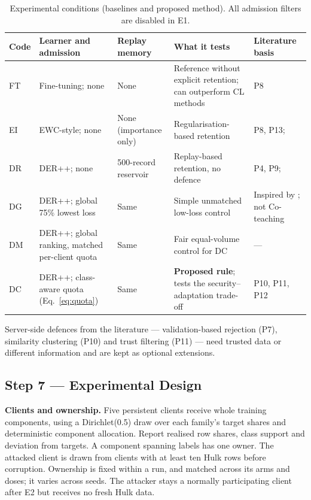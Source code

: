 \documentclass[10pt,a4paper]{article}
\begin{document}
\begin{table}[H]
\centering\footnotesize
\caption{Experimental conditions (baselines and proposed method). All admission filters are disabled in E1.}
\label{tab:arms}
\begin{tabularx}{\linewidth}{L{0.9cm}L{3.4cm}L{3.0cm}Y L{2.4cm}}
\toprule
Code & Learner and admission & Replay memory & What it tests & Literature basis\\
\midrule
FT & Fine-tuning; none & None & Reference without explicit retention; can outperform CL methods & P8\\
EI & EWC-style; none & None (importance only) & Regularisation-based retention & P8, P13; \cite{ewc}\\
DR & DER++; none & 500-record reservoir & Replay-based retention, no defence & P4, P9; \cite{der}\\
DG & DER++; global 75\% lowest loss & Same & Simple unmatched low-loss control & Inspired by \cite{coteach}; not Co-teaching\\
DM & DER++; global ranking, matched per-client quota & Same & Fair equal-volume control for DC & ---\\
DC & DER++; class-aware quota (Eq.~\ref{eq:quota}) & Same & \textbf{Proposed rule}; tests the security--adaptation trade-off & P10, P11, P12\\
\bottomrule
\end{tabularx}
\end{table}
Server-side defences from the literature --- validation-based rejection (P7), similarity clustering (P10) and trust filtering (P11) --- need trusted data or different information and are kept as optional extensions.

\subsection{Step 7 --- Experimental Design}
\textbf{Clients and ownership.} Five persistent clients receive whole training components, using a Dirichlet(0.5) draw over each family's target shares and deterministic component allocation. Report realised row shares, class support and deviation from targets. A component spanning labels has one owner. The attacked client is drawn from clients with at least ten Hulk rows before corruption. Ownership is fixed within a run, and matched across its arms and doses; it varies across seeds. The attacker stays a normally participating client after E2 but receives no fresh Hulk data.
\end{document}
